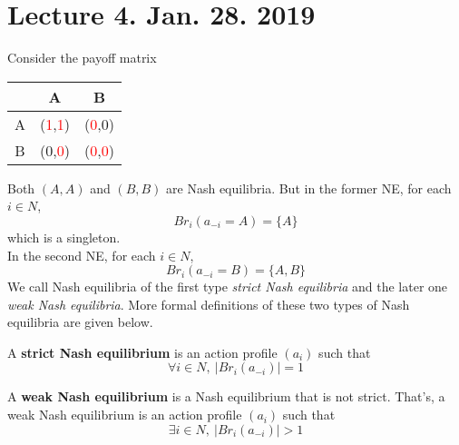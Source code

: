 \documentclass[11pt]{article}
\newcommand{\red}[1]{\textcolor{red}{#1}}
\begin{document}
	\section{Lecture 4. Jan. 28. 2019}
	\begin{example}
		Consider the payoff matrix
		\begin{figure*}[h]
			\centering
			\begin{tabular}{c|c|c}
				 & A & B \\
				\hline
				A & (\red{1},\red{1}) & (\red{0},0) \\
				B & (0,\red{0}) & (\red{0},\red{0}) \\
			\end{tabular}
		\end{figure*}
		Both $(A,A)$ and $(B,B)$ are Nash equilibria. But in the former NE, for each $i \in N$,
		\begin{equation}
			Br_i(a_{-i}=A) = \{A\}
		\end{equation}
		which is a singleton. \\
		In the second NE, for each $i \in N$,
		\begin{equation}
			Br_i(a_{-i}=B) = \{A, B\}
		\end{equation}
		We call Nash equilibria of the first type \emph{strict Nash equilibria} and the later one \emph{weak Nash equilibria}. More formal definitions of these two types of Nash equilibria are given below.
	\end{example}
	
	\begin{definition}
		A \textbf{strict Nash equilibrium} is an action profile $(a_i)$ such that
		\[
			\forall i \in N,\ |Br_i(a_{-i})| = 1
		\]
	\end{definition}
	
	\begin{definition}
		A \textbf{weak Nash equilibrium} is a Nash equilibrium that is not strict. That's, a weak Nash equilibrium is an action profile $(a_i)$ such that
		\[
			\exists i \in N,\ |Br_i(a_{-i})| > 1
		\]
	\end{definition}
	
\end{document}
